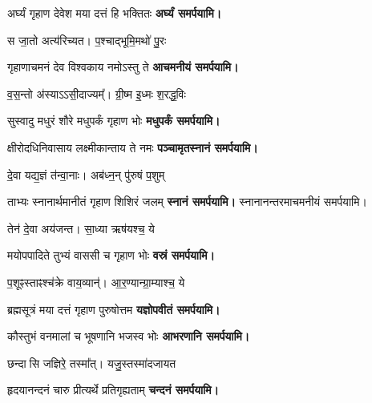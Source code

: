 \begin{center}
{अर्घ्यं गृहाण देवेश मया दत्तं हि भक्तितः}
\textbf{\devAya{} अर्घ्यं समर्पयामि।}

{स जा॒तो अत्य॑रिच्यत। प॒श्चाद्भूमि॒मथो॑ पु॒रः}

{गृहाणाचमनं देव विश्वकाय नमोऽस्तु ते}
\textbf{\devAya{} आचमनीयं समर्पयामि।}
\medskip


{व॒स॒न्तो अ॑स्याऽऽसी॒दाज्यम्᳚। ग्री॒ष्म इ॒ध्मः श॒रद्ध॒विः}

{सुस्वादु मधुरं शौरे मधुपर्कं गृहाण भोः}
\textbf{\devAya{} मधुपर्कं समर्पयामि।}
\medskip


{क्षीरोदधिनिवासाय लक्ष्मीकान्ताय ते नमः}
\textbf{\devAya{} पञ्चामृतस्नानं समर्पयामि।}
\medskip

{दे॒वा यद्य॒ज्ञं त॑न्वा॒नाः। अब॑ध्न॒न् पु॑रुषं प॒शुम्}

{ताभ्यः स्नानार्थमानीतं गृहाण शिशिरं जलम्}
\textbf{\devAya{} स्नानं समर्पयामि।}
स्नानानन्तरमाचमनीयं समर्पयामि।
\medskip

{तेन॑ दे॒वा अय॑जन्त। सा॒ध्या ऋष॑यश्च॒ ये}

{मयोपपादिते तुभ्यं वाससी च गृहाण भोः}
\textbf{\devAya{} वस्रं समर्पयामि।}
\medskip

{प॒शूꣴस्ताꣴश्च॑क्रे वाय॒व्यान्॑। आ॒र॒ण्यान्ग्रा॒म्याश्च॒ ये}

{ब्रह्मसूत्रं मया दत्तं गृहाण पुरुषोत्तम}
\textbf{\devAya{} यज्ञोपवीतं समर्पयामि। }
\medskip

{कौस्तुभं वनमालां च भूषणानि भजस्व भोः}
\textbf{\devAya{} आभरणानि समर्पयामि।} 
\medskip

{छन्दासि जज्ञिरे॒ तस्मा᳚त्। यजु॒स्तस्मा॑दजायत}

{हृदयानन्दनं चारु प्रीत्यर्थे प्रतिगृह्यताम्}
\textbf{\devAya{} चन्दनं समर्पयामि।}
\medskip


\end{center}
